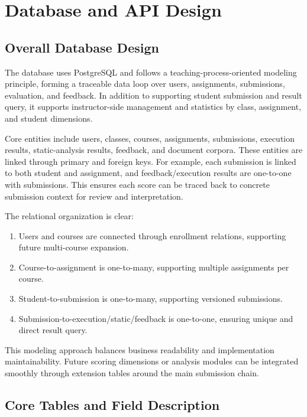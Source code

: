 ﻿\chapter{Database and API Design}


\section{Overall Database Design}

The database uses PostgreSQL and follows a teaching-process-oriented modeling principle, forming a traceable data loop over users, assignments, submissions, evaluation, and feedback. In addition to supporting student submission and result query, it supports instructor-side management and statistics by class, assignment, and student dimensions.

Core entities include users, classes, courses, assignments, submissions, execution results, static-analysis results, feedback, and document corpora. These entities are linked through primary and foreign keys. For example, each submission is linked to both student and assignment, and feedback/execution results are one-to-one with submissions. This ensures each score can be traced back to concrete submission context for review and interpretation.

The relational organization is clear:

\begin{enumerate}
\item Users and courses are connected through enrollment relations, supporting future multi-course expansion.
\item Course-to-assignment is one-to-many, supporting multiple assignments per course.
\item Student-to-submission is one-to-many, supporting versioned submissions.
\item Submission-to-execution/static/feedback is one-to-one, ensuring unique and direct result query.
\end{enumerate}


This modeling approach balances business readability and implementation maintainability. Future scoring dimensions or analysis modules can be integrated smoothly through extension tables around the main submission chain.

\section{Core Tables and Field Description}

